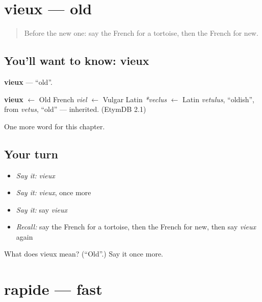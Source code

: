 \section[vieux]{vieux — old}

\label{lesson:FR-C89-vieux}



\begin{quote}
Before the new one: say the French for a tortoise, then the French for new.
\end{quote}

\subsection*{You'll want to know: vieux}
\textbf{vieux} — \textquotedblleft{}old\textquotedblright{}.

\begin{cousinweb}
\textbf{vieux} $\leftarrow$ Old French \emph{viel} $\leftarrow$ Vulgar Latin \emph{*veclus} $\leftarrow$ Latin \emph{vetulus}, \textquotedblleft{}oldish\textquotedblright{}, from \emph{vetus}, \textquotedblleft{}old\textquotedblright{} — inherited. (EtymDB 2.1)
\end{cousinweb}

\begin{grammarlens}[title={What you've built}]
One more word for this chapter.
\end{grammarlens}

\subsection*{Your turn}
\begin{itemize}
\raggedright
  \item \emph{Say it:} \emph{vieux}
  \item \emph{Say it:} \emph{vieux}, once more
  \item \emph{Say it:} say \emph{vieux}
  \item \emph{Recall:} say the French for a tortoise, then the French for new, then say \emph{vieux} again
\end{itemize}

\begin{tcolorbox}[breakable,colback=teal!4,colframe=teal!35!black,title={Before you move on}]
What does vieux mean? (\textquotedblleft{}Old\textquotedblright{}.) Say it once more.
\end{tcolorbox}
\section[rapide]{rapide — fast}


